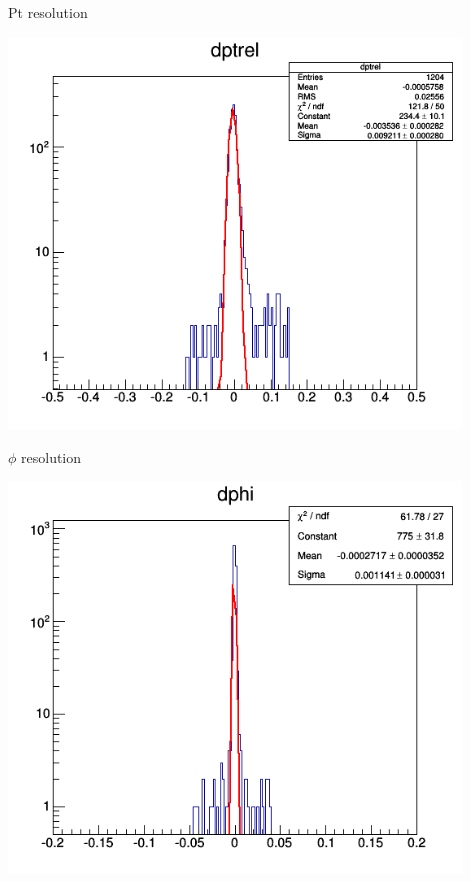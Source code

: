 \documentclass[10pt]{beamer}
\begin{document}
\begin{frame}{Pt resolution}
	\centerline{\includegraphics[width=0.9\textwidth,height=0.9\textheight]{dpt_acu.png}}

\end{frame}
\begin{frame}{$\phi$ resolution}
	\centerline{\includegraphics[width=0.9\textwidth,height=0.9\textheight]{dphi_acu.png}}

\end{frame}
\end{document}
